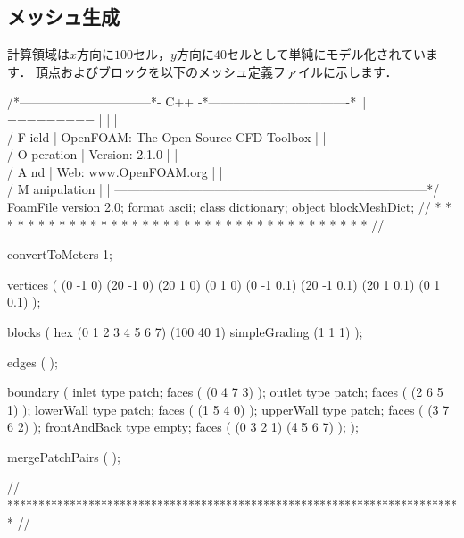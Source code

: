 \subsection{メッシュ生成}
\label{ssec:3.5.2}
計算領域は$x$方向に$100$セル，$y$方向に$40$セルとして単純にモデル化されています．
頂点およびブロックを以下のメッシュ定義ファイルに示します．
\begin{OFverbatim}
/*--------------------------------*- C++ -*----------------------------------*\
| =========                 |                                                 |
| \\      /  F ield         | OpenFOAM: The Open Source CFD Toolbox           |
|  \\    /   O peration     | Version:  2.1.0                                 |
|   \\  /    A nd           | Web:      www.OpenFOAM.org                      |
|    \\/     M anipulation  |                                                 |
\*---------------------------------------------------------------------------*/
FoamFile
{
    version     2.0;
    format      ascii;
    class       dictionary;
    object      blockMeshDict;
}
// * * * * * * * * * * * * * * * * * * * * * * * * * * * * * * * * * * * * * //

convertToMeters 1;

vertices        
(
    (0 -1 0)
    (20 -1 0)
    (20 1 0)
    (0 1 0)
    (0 -1 0.1)
    (20 -1 0.1)
    (20 1 0.1)
    (0 1 0.1)
);

blocks          
(
    hex (0 1 2 3 4 5 6 7) (100 40 1) simpleGrading (1 1 1)
);

edges           
(
);

boundary
(
    inlet
    {
        type patch;
        faces
        (
            (0 4 7 3)
        );
    }
    outlet
    {
        type patch;
        faces
        (
            (2 6 5 1)
        );
    }
    lowerWall
    {
        type patch;
        faces
        (
            (1 5 4 0)
        );
    }
    upperWall
    {
        type patch;
        faces
        (
            (3 7 6 2)
        );
    }
    frontAndBack
    {
        type empty;
        faces
        (
            (0 3 2 1)
            (4 5 6 7)
        );
    }
);

mergePatchPairs
(
);

// ************************************************************************* //
\end{OFverbatim}


